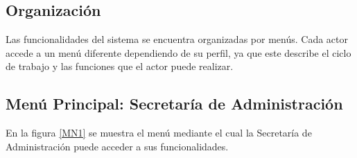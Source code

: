   






  
\subsection{Organización}
Las funcionalidades del sistema se encuentra organizadas por menús. Cada actor accede a un menú diferente dependiendo de su perfil, ya que este describe el ciclo de trabajo y las funciones que el actor puede realizar.


\hypertarget{menu:SecretariaAdministracion}{}	
\subsection{Menú Principal: Secretaría de Administración}
En la figura \ref{MN1} se muestra el menú mediante el cual la Secretaría de Administración puede acceder a sus funcionalidades.


